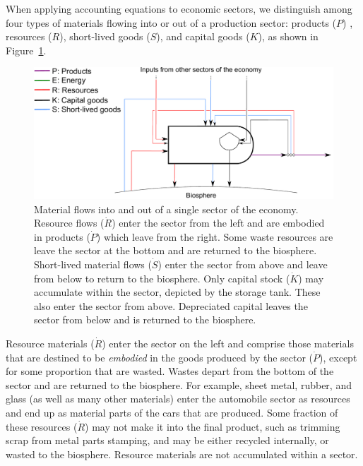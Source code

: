 When applying accounting equations to economic sectors,
we distinguish among four types of
materials flowing into or out of a production sector: 
products ($P$) , 
resources ($R$),
short-lived goods ($S$),
and capital goods ($K$), 
as shown in Figure~\ref{fig:PERKS_materials}.

\begin{figure}[!ht]
\centering{}
\includegraphics[width=0.8\linewidth]{Part_1/Chapter_Materials/images/PERKS_basic_unit_materials.pdf}
\caption[Material flows into and out of a single sector 
of the economy.]{Material flows into and out of 
a single sector of the economy. 
Resource flows ($\dot{R}$) enter the sector from the left 
and are embodied in products ($\dot{P}$) which leave from the right. 
Some waste resources are leave the sector at the bottom and are returned to the biosphere.
Short-lived material flows ($\dot{S}$) 
enter the sector from above and leave from below to return to the biosphere. 
Only capital stock ($\dot{K}$) may accumulate within the sector, depicted by the storage tank.
These also enter the sector from above. 
Depreciated capital leaves the sector from below and is returned to the biosphere.}
\label{fig:PERKS_materials}
\end{figure}

Resource materials ($\dot{R}$) 
enter the sector on the left 
and comprise those materials that are destined to be \emph{embodied} 
in the goods produced by the sector ($\dot{P}$), 
except for some proportion that are wasted.
Wastes depart from the bottom of the sector and are
returned to the biosphere. 
For example, sheet metal, rubber, and glass
(as well as many other materials) 
enter the automobile sector as resources 
and end up as material parts of the cars that are produced. 
Some fraction of these resources ($\dot{R}$) may not make it into the final product, 
such as trimming scrap from metal parts stamping, 
and may be either recycled internally, 
or wasted to the biosphere. 
Resource materials are not accumulated within a sector.

